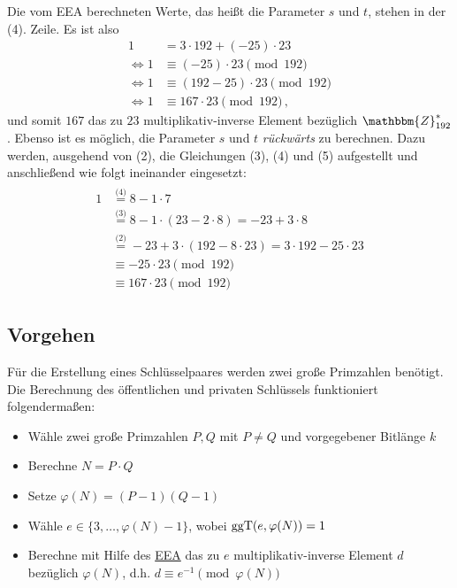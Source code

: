 \begin{beispiel}[EEA]
	Die vom EEA berechneten Werte, das heißt die Parameter $s$ und $t$, stehen in der (4). Zeile. Es ist also 
	\begin{align*}
		1 &= 3 \cdot 192 + (-25) \cdot 23\\
		\Leftrightarrow 1 &\equiv (-25) \cdot 23 \pmod{192}\\
		\Leftrightarrow 1 &\equiv (192 - 25) \cdot 23 \pmod{192}\\ 
		\Leftrightarrow 1 &\equiv 167 \cdot 23 \pmod{192}\, \text{,}
	\end{align*}
	und somit $167$ das zu $23$ multiplikativ-inverse Element bezüglich $\mathbbm{Z}^{\ast}_{192}$.
	Ebenso ist es möglich, die Parameter $s$ und $t$ \emph{rückwärts} zu berechnen. Dazu werden, ausgehend von (2), 
	die Gleichungen (3), (4) und (5) aufgestellt und anschließend wie folgt ineinander eingesetzt:  
	\begin{align*}
		\begin{split}
			1	&\stackrel{\textit{(4)}}{=} 8 - 1 \cdot 7\\
				&\stackrel{\textit{(3)}}{=} 8 - 1 \cdot (23 - 2 \cdot 8) = -23 + 3 \cdot 8\\
				&\stackrel{\textit{(2)}}{=} -23 + 3 \cdot (192 - 8 \cdot 23) = 3 \cdot 192 - 25 \cdot 23\\[.5cm]
				&\equiv -25 \cdot 23 \pmod{192}\\
				&\equiv 167 \cdot 23 \pmod{192}
		\end{split}
	\end{align*}
\end{beispiel}

\subsection{Vorgehen}
\label{ch:asymmenc:rsa:vorgehen}
Für die Erstellung eines Schlüsselpaares werden zwei große Primzahlen benötigt. Die Berechnung des öffentlichen und privaten Schlüssels funktioniert folgendermaßen:
\begin{itemize}
 	\item Wähle zwei große Primzahlen $P, Q$ mit $P \neq Q$ und vorgegebener Bitlänge $k$
 	\item Berechne $N = P \cdot Q$
 	\item Setze $\varphi(N) = (P - 1)(Q - 1)$
 	\item Wähle $e \in \{3, \dotsc, \varphi(N) - 1\}$, wobei $\operatorname{ggT}(e, \varphi(N)) = 1$
 	\item Berechne mit Hilfe des \hyperref[ssec:eea]{EEA} das zu $e$ multiplikativ-inverse Element $d$ bezüglich $\varphi(N)$, d.h. $d \equiv e^{-1} \pmod{\varphi(N)}$
\end{itemize}

